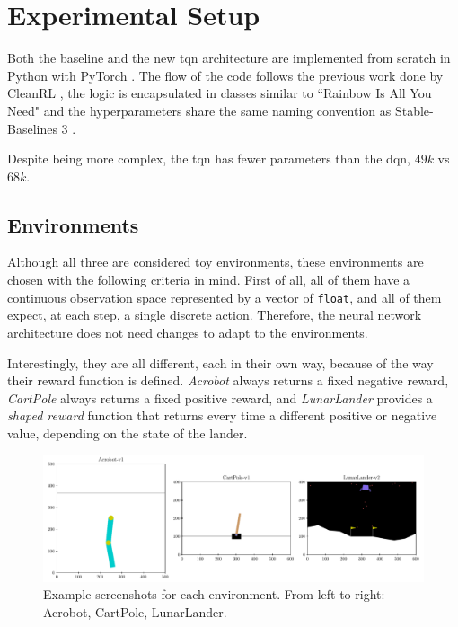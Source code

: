 \section{Experimental Setup}

Both the baseline and the new \acrshort{tqn} architecture are implemented from scratch in Python with PyTorch \cite{pytorch}. The flow of the code follows the previous work done by CleanRL \cite{cleanrl}, the logic is encapsulated in classes similar to ``Rainbow Is All You Need" \cite{rainbow_is_all_you_need} and the hyperparameters share the same naming convention as Stable-Baselines 3 \cite{sb3}.

Despite being more complex, the \acrshort{tqn} has fewer parameters than the \acrshort{dqn}, $49k$ vs $68k$.

\subsection{Environments}
Although all three are considered toy environments, these environments are chosen with the following criteria in mind. First of all, all of them have a continuous observation space represented by a vector of \texttt{float}, and all of them expect, at each step, a single discrete action. Therefore, the neural network architecture does not need changes to adapt to the environments.

Interestingly, they are all different, each in their own way, because of the way their reward function is defined. \textit{Acrobot} always returns a fixed negative reward, \textit{CartPole} always returns a fixed positive reward, and \textit{LunarLander} provides a \textit{shaped reward} function that returns every time a different positive or negative value, depending on the state of the lander.

\begin{figure}[H]
\centering
\includegraphics[width=\textwidth]{images/environments.pdf}
\caption{Example screenshots for each environment. From left to right: Acrobot, CartPole, LunarLander.}
\label{fig:environments}
\end{figure}

